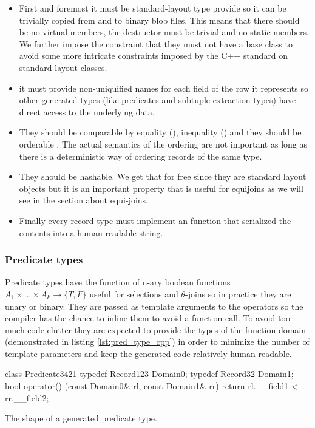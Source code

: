 \begin{itemize}
\item First and foremost it must be standard-layout type provide so it can
be trivially copied from and to binary blob files. This means that
there should be no virtual members, the destructor must be trivial
and no static members. We further impose the constraint that they
must not have a base class to avoid some more intricate constraints
imposed by the C++ standard on standard-layout classes.
\item it must provide non-uniquified names for each field of the row it
represents so other generated types (like predicates and subtuple
extraction types) have direct access to the underlying data.
\item They should be comparable by equality (\cpp{==}), inequality (\cpp{!=}) and
they should be orderable \cpp{<}. The actual semantics of the ordering
are not important as long as there is a deterministic way of
ordering records of the same type.
\item They should be hashable. We get that for free since they are
standard layout objects but it is an important property that is
useful for equijoins as we will see in the section about equi-joins.
\item Finally every record type must implement an  function that serialized the contents into a human readable
string.
\end{itemize}

\subsubsection{Predicate types}

Predicate types have the function of n-ary boolean functions \(A_1
\times ... \times A_k \to \{T,F\}\) useful for selections and
\(\theta\)-joins so in practice they are unary or binary. They are
passed as template arguments to the operators so the compiler has the
chance to inline them to avoid a function call. To avoid too much code
clutter they are expected to provide the types of the function domain
(demonstrated in listing \ref{lst:pred_type_cpp}) in order to minimize
the number of template parameters and keep the generated code
relatively human readable.

\begin{code}
\begin{cppcode}
class Predicate3421 {
  typedef Record123 Domain0;
  typedef Record32 Domain1;
  bool operator() (const Domain0& rl, const Domain1& rr) {
    return rl.__field1 < rr.__field2;
  }
}
\end{cppcode}
\caption{\label{lst:pred_type_cpp}The shape of a generated predicate type.}
\end{code}

